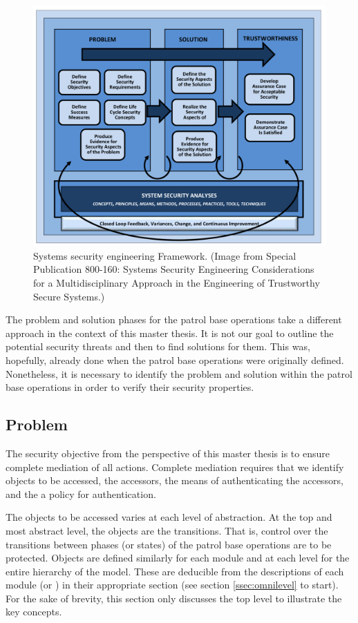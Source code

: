\documentclass[../../main/main.tex]{subfiles}
\begin{document}
\begin{figure}[h]
\includegraphics[width=\linewidth]{../figures/sseframework}
\caption{\label{sseframework}Systems security engineering Framework. (Image from  Special Publication 800-160: Systems Security Engineering Considerations for a Multidisciplinary Approach in the Engineering of Trustworthy Secure Systems.)}
\end{figure}

The problem and solution phases for the patrol base operations take a different approach in the context of this master thesis. It is not our goal to outline the potential security threats and then to find solutions for them.  This was, hopefully, already done when the patrol base operations were originally defined.  Nonetheless, it is necessary to identify the problem and solution within the patrol base operations in order to verify their security properties.  


\subsection{Problem}
The security objective from the perspective of this master thesis is to ensure complete mediation of all actions.  Complete mediation requires that we identify objects to be accessed, the accessors, the means of authenticating the accessors, and the a policy for authentication.  

The objects to be accessed varies at each level of abstraction. At the top and most abstract level, the objects are the transitions.  That is, control over the transitions between phases (or states) of the patrol base operations are to be protected.  Objects are defined similarly for each module and at each level for the entire hierarchy of the model.  These are deducible from the descriptions of each module (or ) in their appropriate section (see section \ref{ssec:omnilevel} to start).  For the sake of brevity, this section only discusses the top level to illustrate the key concepts.  
\end{document}

